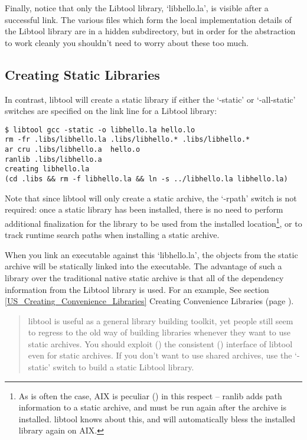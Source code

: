 Finally, notice that only the Libtool library, `libhello.la', is visible after a successful link. The various files which form the local implementation details of the Libtool library are in a hidden subdirectory, but in order for the abstraction to work cleanly you shouldn't need to worry about these too much. 

\subsection{Creating Static Libraries}\label{SB_Creating_Static_Libraries}


In contrast, libtool will create a static library if either the `-static' or `-all-static' switches are specified on the link line for a Libtool library: 


\begin{Verbatim}
$ libtool gcc -static -o libhello.la hello.lo
rm -fr .libs/libhello.la .libs/libhello.* .libs/libhello.*
ar cru .libs/libhello.a  hello.o
ranlib .libs/libhello.a
creating libhello.la
(cd .libs && rm -f libhello.la && ln -s ../libhello.la libhello.la)
\end{Verbatim}


Note that since libtool will only create a static archive, the `-rpath' switch 
is not required: once a static library has been installed, there is no need to 
perform additional finalization for the library to be used from the installed 
location\footnote{As is often the case, AIX is peculiar ({\MeQ{}}) in this 
respect -- ranlib adds path information to a static archive,
and must be run again after 
the archive is installed. libtool knows about this, and will automatically 
bless the installed library again on AIX.}, or to track runtime search paths 
when installing a static archive. 


When you link an executable against this `libhello.la', the objects from 
the static archive will be statically linked into the executable. The 
advantage of such a library over the traditional native static archive is 
that all of the dependency information from the Libtool library is used.
For an example, See section \ref{US_Creating_Convenience_Libraries}
Creating Convenience Libraries
(page \pageref{US_Creating_Convenience_Libraries}). 


\begin{quote}
libtool is useful as a general library building toolkit, yet people still 
seem to regress to the old way of building libraries whenever they want to 
use static archives. You should exploit ({\MaQ{}}) the consistent ({\MaQ{}})
interface of libtool even for static archives. If you don't want to use shared 
archives, use the `-static' switch to build a static Libtool library. 
\end{quote}

